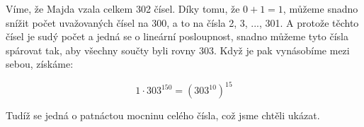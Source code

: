 \documentclass{fkssolpub}
\author{Ondřej Sedláček}
\begin{document}
 

Víme, že Majda vzala celkem 302 čísel. Díky tomu, že $0 + 1 = 1$,
můžeme snadno snížit počet uvažovaných čísel na 300, a to na čísla
2, 3, ..., 301. A protože těchto čísel je sudý počet a jedná se o
lineární posloupnost, snadno můžeme tyto čísla spárovat tak, aby všechny
součty byli rovny 303. Když je pak vynásobíme mezi sebou, získáme:

\[
  1 \cdot 303^{150} = (303^{10})^{15}
\]

Tudíž se jedná o patnáctou mocninu celého čísla, což jsme chtěli ukázat.
\end{document}
